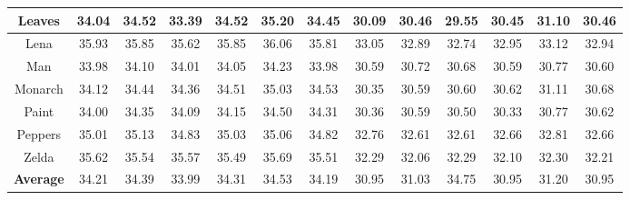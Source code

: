 \begin{table}[t!]
\begin{adjustwidth}{-0.2cm}{}
\begin{center}
\begin{tabular}{|c||c|c|c|c|c|c||c|c|c|c|c|c|}
\\
\hline
 Leaves &34.04&34.52&33.39&34.52&35.20& 34.45   &30.09&30.46&29.55&30.45 &31.10&30.46 
\\
\hline
 Lena &35.93 &35.85&35.62&35.85&36.06&35.81    &33.05 &32.89&32.74&32.95&33.12&32.94  
\\
\hline
 Man &33.98 &34.10&34.01&34.05&34.23&33.98    &30.59&30.72&30.68&30.59 &30.77&30.60   
\\
\hline
 Monarch &34.12&34.44&34.36 &34.51&35.03&34.53     &30.35 &30.59&30.60 &30.62&31.11&30.68
\\
\hline
 Paint &34.00&34.35&34.09&34.15&34.50&34.31     &30.36&30.59 &30.50&30.33&30.77&30.62  
\\
\hline
 Peppers &35.01&35.13&34.83 &35.03&35.06&34.82    &32.76&32.61 &32.61&32.66&32.81&32.66 
\\
\hline
 Zelda &35.62&35.54&35.57 &35.49&35.69&35.51     &32.29 &32.06 &32.29&32.10&32.30 &32.21
\\
\hline
 \textbf{Average} &34.21&34.39&33.99 &34.31&34.53&34.19  &30.95 &31.03 &34.75&30.95&31.20&30.95   
\\
\hline
\end{tabular}
\end{center}
\end{adjustwidth}
\end{table}

